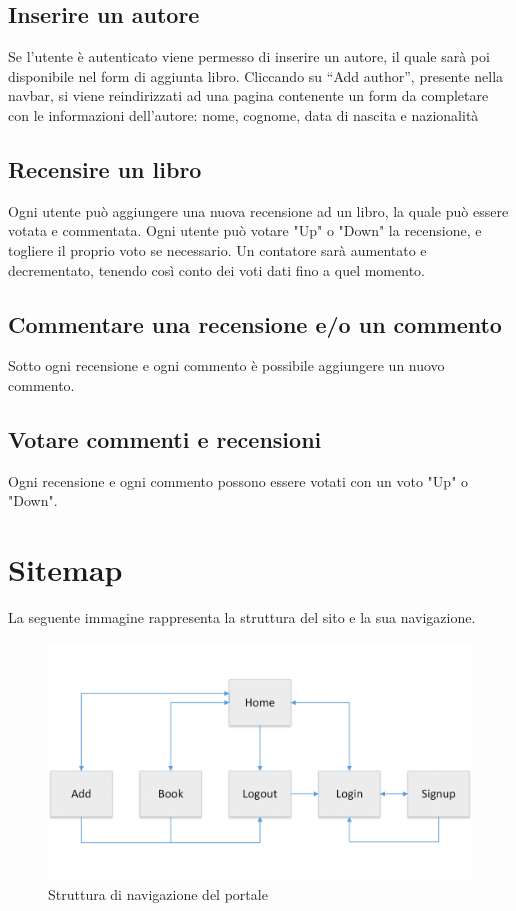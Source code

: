 \documentclass[italian]{article}
\begin{document}
\subsection{Inserire un autore}
Se l'utente è autenticato viene permesso di inserire un autore, il quale sarà poi disponibile nel form di aggiunta libro. Cliccando su “Add author”, presente nella navbar, si viene reindirizzati ad una pagina contenente un form da completare con le informazioni dell’autore: nome, cognome, data di nascita e nazionalità

\subsection{Recensire un libro}
Ogni utente può aggiungere una nuova recensione ad un libro, la quale può essere votata e commentata. Ogni utente può votare "Up" o "Down" la recensione, e togliere il proprio voto se necessario. Un contatore sarà aumentato e decrementato, tenendo così conto dei voti dati fino a quel momento. 

\subsection{Commentare una recensione e/o un commento}
Sotto ogni recensione e ogni commento è possibile aggiungere un nuovo commento.

\subsection{Votare commenti e recensioni}
Ogni recensione e ogni commento possono essere votati con un voto "Up" o "Down".

\pagebreak
\section{Sitemap}
La seguente immagine rappresenta la struttura del sito e la sua navigazione.
\begin{figure}[h]
	\centering
	\includegraphics[width=1\linewidth]{images/sitemap}
	\caption[Sitemap]{Struttura di navigazione del portale}
	\label{fig:sitemap}
\end{figure}
\end{document}
